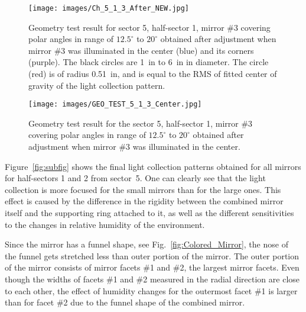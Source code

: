 \begin{figure}[ht]
    \centering
    \texttt{[image: images/Ch\_5\_1\_3\_After\_NEW.jpg]}
    \caption{Geometry test result for sector 5, half-sector 1, mirror \#3 covering polar angles in range of
      $12.5^\circ$ to $20^\circ$ obtained after adjustment when mirror \#3 was illuminated in the center (blue) and
      its corners (purple). The black circles are 1~in to 6~in in diameter. The circle (red) is of radius 0.51~in, and is
      equal to the RMS of fitted center of gravity  of the light collection pattern.}
    \label{fig:Ch_5_1_3_After_NEW}
\end{figure}

\begin{figure}[ht]
    \centering
    \texttt{[image: images/GEO\_TEST\_5\_1\_3\_Center.jpg]}
    \caption{Geometry test result for the sector 5, half-sector 1, mirror \#3 covering polar angles in range of
      $12.5^\circ$ to $20^\circ$ obtained after adjustment when mirror \#3 was illuminated in the center.}
    \label{fig:GEO_TEST_5_1_3_Center}
\end{figure}

Figure~\ref{fig:subfig} shows the final light collection patterns obtained for all mirrors for half-sectors 1 and
2 from sector~5. One can clearly see that the light collection is more focused for the small mirrors than for the
large ones. This effect is caused by the difference in the rigidity between the combined mirror itself and the
supporting ring attached to it, as well as the different sensitivities to the changes in relative humidity of the
environment.
 
Since the mirror has a funnel shape, see Fig.~\ref{fig:Colored_Mirror}, the nose of the funnel gets stretched
less than outer portion of the mirror. The outer portion of the mirror consists of mirror facets \#1 and \#2, the
largest mirror facets. Even though the widths of facets \#1 and \#2 measured in the radial direction are close to
each other, the effect of humidity changes for the outermost facet \#1 is larger than for facet \#2 due to the
funnel shape of the combined mirror.

